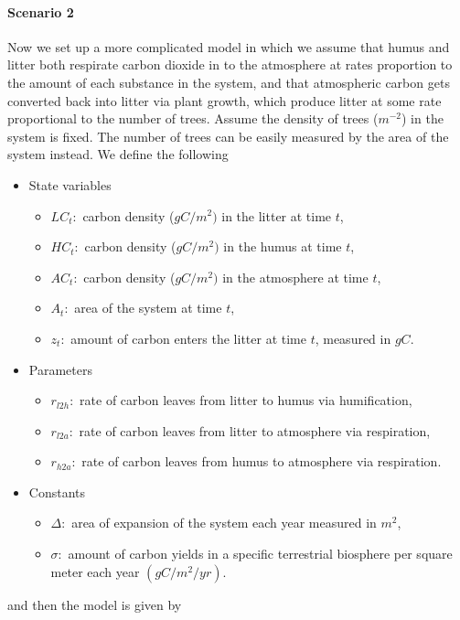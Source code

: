 \documentclass[a4paper]{article}
\begin{document}
    \paragraph{Scenario 2} Now we set up a more complicated model in which we assume that humus and litter both respirate carbon dioxide in to the atmosphere at rates proportion to the amount of each substance in the system, and that atmospheric carbon gets converted back into litter via plant growth, which produce litter at some rate proportional to the number of trees. Assume the density of trees ($m^{-2}$) in the system is fixed. The number of trees can be easily measured by the area of the system instead. We define the following \begin{itemize}
        \item State variables \begin{itemize}
            \item $LC_t:$ carbon density ($gC/m^2)$ in the litter at time $t$,
            \item $HC_t:$ carbon density ($gC/m^2)$ in the humus at time $t$,
            \item $AC_t:$ carbon density ($gC/m^2)$ in the atmosphere at time $t$,
            \item $A_t:$ area of the system at time $t$,
            \item $z_t:$ amount of carbon enters the litter at time $t$, measured in $gC$.
        \end{itemize}
        \item Parameters \begin{itemize}
            \item $r_{l2h}:$ rate of carbon leaves from litter to humus via humification,
            \item $r_{l2a}:$ rate of carbon leaves from litter to atmosphere via respiration,
            \item $r_{h2a}:$ rate of carbon leaves from humus to atmosphere via respiration. 
        \end{itemize}
        \item Constants \begin{itemize}
            \item $\Delta:$ area of expansion of the system each year measured in $m^2$,
            \item $\sigma:$ amount of carbon yields in a specific terrestrial biosphere per square meter each year $(gC/m^2/yr)$.
        \end{itemize}
    \end{itemize} and then the model is given by \begin{align}

\end{align}
\end{document}
